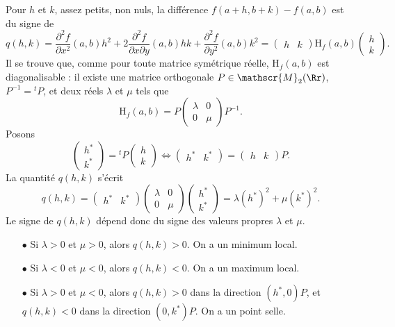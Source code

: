 \documentclass[class=report,crop=false]{standalone}
\begin{document}
\vskip4mm

Pour $h$ et $k$, assez petits, non nuls, la différence $f(a+h,b+k)-f(a,b)$ est du signe de
$$q(h,k)=\frac{\partial ^2f}{\partial x^2}(a,b)h^2+2\frac{\partial ^2f}{\partial x\partial y }(a,b)hk+\frac{\partial ^2f}{\partial y^2}(a,b)k^2=\left(\begin{array}{cc}h&k
\end{array}\right)\mbox{H}_f(a,b)\left(\begin{array}{c}h\\k\end{array}\right).$$
Il se trouve que, comme pour toute matrice symétrique réelle, $\mbox{H}_f(a,b)$ est diagonalisable : il existe une matrice orthogonale $P\in \mathscr{M}_2(\Rr)$, $P^{-1}={^tP}$, et deux réels $\lambda$ et $\mu$ tels que 
$$\mbox{H}_f(a,b)=P\left(\begin{array}{cc}\lambda &0\\ 0&\mu\end{array}\right)P^{-1}.$$
Posons
$$\left(\begin{array}{c}h^*\\k^*\end{array}\right)={^tP}\left(\begin{array}{c}h\\k\end{array}\right) \Leftrightarrow \left(\begin{array}{cc}h^*&k^*\end{array}\right)=\left(\begin{array}{cc}h&k\end{array}\right)P.$$
La quantité $q(h,k)$ s'écrit
$$q(h,k)=\left(\begin{array}{cc}h^*&k^*\end{array}\right)\left(\begin{array}{cc}\lambda &0\\ 0&\mu\end{array}\right)\left(\begin{array}{c}h^*\\k^*\end{array}\right)=\lambda (h^*)^2+\mu (k^*)^2.$$
Le signe de $q(h,k)$ dépend donc du signe des valeurs propres $\lambda$ et $\mu$.
\begin{enumerate}
\item[$\bullet$] Si $\lambda >0$ et $\mu >0$, alors $q(h,k)>0$. On a un minimum local.
\item[$\bullet$] Si $\lambda <0$ et $\mu <0$, alors $q(h,k)<0$. On a un maximum local.
\item[$\bullet$] Si $\lambda >0$ et $\mu <0$, alors $q(h,k)>0$ dans la direction $(h^*,0)P$, et $q(h,k)<0$ dans la direction $(0,k^*)P$. On a un point selle.
\end{enumerate}
\end{document}
